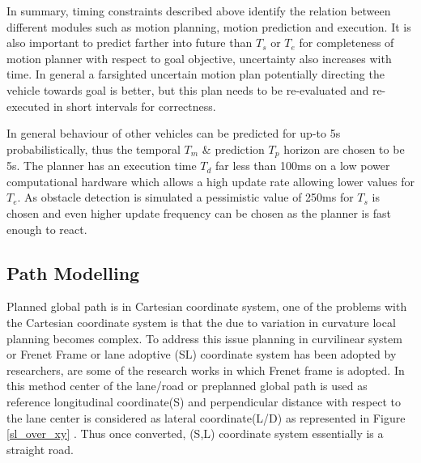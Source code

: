 In summary, timing constraints described above identify the relation between different modules such as motion planning, motion prediction and execution. It is also important to predict farther into future than $T_s$ or  $T_e$ for completeness of motion planner with respect to goal objective, uncertainty also increases with time. In general a farsighted uncertain motion plan potentially directing the vehicle towards goal is better, but this plan needs to be re-evaluated and re-executed in short intervals for correctness. 

In general behaviour of other vehicles can be predicted for up-to 5s probabilistically, thus the temporal $ T_m $ \& prediction $ T_p $ horizon are chosen to be 5s. The planner has an execution time $ T_d $ far less than 100ms on a low power computational hardware which allows a high update rate allowing lower values for $ T_e $. As obstacle detection is simulated a pessimistic value of 250ms for $ T_s $ is chosen and even higher update frequency can be chosen as the planner is fast enough to react. 


\subsection{Path Modelling} \label{frenet_frame}

 Planned global path is in Cartesian coordinate system, one of the problems with the Cartesian coordinate system is that the due to variation in curvature local planning becomes complex. To address this issue planning in curvilinear system or Frenet Frame or  lane adoptive (SL) coordinate system has been adopted by researchers, \cite{traj_planner_optimization} \cite{spatio_temporal_state_lattice} \cite{diss_shui_phd_thesis} \cite{real_time_traj_plan_article} \cite{volvo_reactive_traj} \cite{curvilinear_System_Automated_Drv} are some of the research works in which Frenet frame is adopted. In this method center of the lane/road or preplanned global path is used as reference longitudinal coordinate(S) and perpendicular distance with respect to the lane center is considered as lateral coordinate(L/D) as represented in Figure \ref{sl_over_xy} \cite{diss_shui_phd_thesis}.  Thus once converted, (S,L) coordinate system essentially is a straight road.
 
